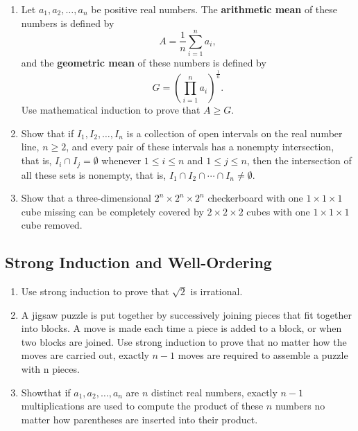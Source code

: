\documentclass{../../cls/sig-alternate-05-2015}
\begin{document}
\begin{enumerate}
\item Let $a_1, a_2, \ldots, a_n$ be positive real numbers.
The \textbf{arithmetic mean} of these numbers is defined by \begin{equation}
	A = \frac{1}{n} \sum_{i = 1}^n a_i,
\end{equation} and the \textbf{geometric mean} of these numbers is defined by \begin{equation}
	G = \left(\prod_{i = 1}^{n} a_i\right)^\frac{1}{n}.
\end{equation}
Use mathematical induction to prove that $A \ge G$.

\item Show that if $I_1, I_2, \ldots, I_n$ is a collection of open intervals on the real number line,
$n \ge 2$,
and every pair of these intervals has a nonempty intersection,
that is,
$I_i \cap I_j = \emptyset$ whenever $1 \le i \le n$ and $1 \le j \le n$,
then the intersection of all these sets is nonempty, that is,
$I_1 \cap I_2 \cap \cdots \cap I_n \ne \emptyset$.

\item Show that a three-dimensional $2^n \times 2^n \times 2^n$ checkerboard with one $1 \times 1 \times 1$ cube missing can be completely covered by $2 \times 2 \times 2$ cubes with one $1 \times 1 \times 1$ cube removed.

\end{enumerate}

\subsection{Strong Induction and Well-Ordering}
\begin{enumerate}
\item Use strong induction to prove that $\sqrt{2}$ is irrational.

\item A jigsaw puzzle is put together by successively joining
pieces that fit together into blocks. A move is made each
time a piece is added to a block, or when two blocks
are joined. Use strong induction to prove that no matter
how the moves are carried out, exactly $n - 1$ moves are
required to assemble a puzzle with n pieces.

\item Showthat if $a_1, a_2, \ldots, a_n$ are $n$ distinct real numbers, exactly $n - 1$ multiplications are used to compute the product of these $n$ numbers no matter how parentheses are inserted into their product.

\end{enumerate}
\end{document}
